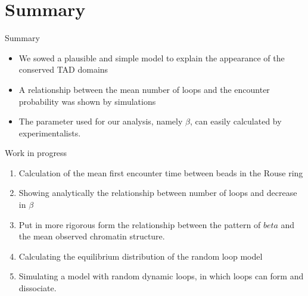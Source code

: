 \documentclass[8pt]{beamer}
\begin{document}
\section{Summary}\label{section_summaryAndFutureWork}
\begin{frame}{Summary}
\begin{itemize}
\item We sowed a plausible and simple model to explain the appearance of the conserved TAD domains 
\item A relationship between the mean number of loops and the encounter probability was shown by simulations
\item The parameter used for our analysis, namely $\beta$, can easily calculated by experimentalists. 
\end{itemize}
\end{frame}

\begin{frame}{Work in progress}
\begin{enumerate}
\item Calculation of the mean first encounter time between beads in the Rouse ring
\item Showing analytically the relationship between number of loops and decrease in $\beta$
\item Put in more rigorous form the relationship between the pattern of $beta$ and the mean observed chromatin structure.
\item Calculating the equilibrium distribution of the random loop model
\item Simulating a model with random dynamic loops, in which loops can form and dissociate.
\end{enumerate}
\end{frame}
\end{document}
